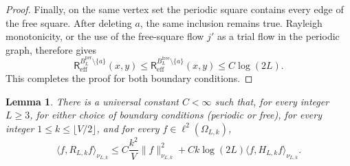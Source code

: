 \documentclass[11pt]{article}
\numberwithin{equation}{section}
\newtheorem{lemma}[theorem]{Lemma}
\theoremstyle{remark}
\newcommand{\1}{\mathbf 1}
\begin{document}
\begin{proof}
Finally, on the same vertex set the periodic square contains every edge
of the free square.  After deleting \(a\), the same inclusion remains
true.  Rayleigh monotonicity, or the use of the free-square flow \(j'\) as
a trial flow in the periodic graph, therefore gives
\[
 \mathsf R_{\mathrm{eff}}^{B_L^{\mathrm{per}}\setminus\{a\}}(x,y)
 \leq
 \mathsf R_{\mathrm{eff}}^{B_L^{\mathrm{free}}\setminus\{a\}}(x,y)
 \leq C\log(2L).
\]
This completes the proof for both boundary conditions.
\end{proof}

\begin{lemma}
\label{lem:contact-bound}
There is a universal constant \(C<\infty\) such that, for every integer
\(L\geq3\), for either choice of boundary conditions
(periodic or free), for every integer
\(1\leq k\leq\lfloor V/2\rfloor\), and for every
\(f\in\ell^2(\Omega_{L,k})\),
\begin{equation}
 \langle f,R_{L,k}f\rangle_{\nu_{L,k}}
 \leq C\frac{k^2}{V}\|f\|_{\nu_{L,k}}^2
 +Ck\log(2L)\langle f,H_{L,k}f\rangle_{\nu_{L,k}}.
 \label{eq:contact-bound}
\end{equation}
\end{lemma}
\end{document}
